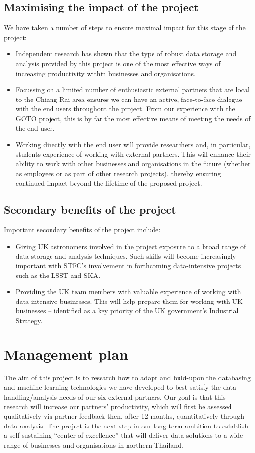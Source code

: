 \documentclass[11pt]{article}
\begin{document}
\subsection{Maximising the impact of the project}
We have taken a number of steps to ensure maximal impact for this stage of the project:
\begin{itemize}[leftmargin=6mm]
  \item Independent research has shown that the type of robust data storage and analysis provided by this project is one of the most effective ways of increasing productivity within businesses and organisations. 
  \item Focussing on a limited number of enthusiastic external partners that are local to the Chiang Rai area ensures we can have an active, face-to-face dialogue with the end users throughout the project. From our experience with the GOTO project, this is by far the most effective means of meeting the needs of the end user.
  \item Working directly with the end user will provide researchers and, in particular, students experience of working with external partners. This will enhance their ability to work with other businesses and organisations in the future (whether as employees or as part of other research projects), thereby ensuring continued impact beyond the lifetime of the proposed project. 
\end{itemize}

\subsection{Secondary benefits of the project}
Important secondary benefits of the project include:
\begin{itemize}[leftmargin=6mm]
  \item Giving UK astronomers involved in the project exposure to a broad range of data storage and analysis techniques. Such skills will become increasingly important with STFC's involvement in forthcoming data-intensive projects such as the LSST and SKA.
  \item Providing the UK team members with valuable experience of working with data-intensive businesses. This will help prepare them for working with UK businesses -- identified as a key priority of the UK government's Industrial Strategy.   
\end{itemize}

\section{Management plan}
The aim of this project is to research how to adapt and buld-upon the databasing and machine-learning technologies we have developed to best satisfy the data handling/analysis needs of our six external partners. Our goal is that this research will increase our partners' productivity, which will first be assessed qualitatively via partner feedback then, after 12 months, quantitatively through data analysis. The project is the next step in our long-term ambition to establish a self-sustaining ``center of excellence'' that will deliver data solutions to a wide range of businesses and organisations in northern Thailand.
\end{document}
